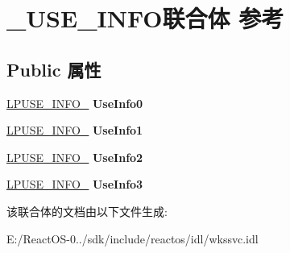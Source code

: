 \hypertarget{union___u_s_e___i_n_f_o}{}\section{\+\_\+\+U\+S\+E\+\_\+\+I\+N\+F\+O联合体 参考}
\label{union___u_s_e___i_n_f_o}
\subsection*{Public 属性}
\begin{DoxyCompactItemize}
\item 
\mbox{\label{union___u_s_e___i_n_f_o_a0598db1d840454bf62f693c88675dff3}} 
\hyperlink{struct___u_s_e___i_n_f_o__0}{L\+P\+U\+S\+E\+\_\+\+I\+N\+F\+O\+\_} {\bfseries Use\+Info0}
\item 
\mbox{\label{union___u_s_e___i_n_f_o_a307e20afe58c0661dd86d7f650014f1a}} 
\hyperlink{struct___u_s_e___i_n_f_o__1}{L\+P\+U\+S\+E\+\_\+\+I\+N\+F\+O\+\_} {\bfseries Use\+Info1}
\item 
\mbox{\label{union___u_s_e___i_n_f_o_af263e49ead9439a0b646451dc0ae0325}} 
\hyperlink{struct___u_s_e___i_n_f_o__2}{L\+P\+U\+S\+E\+\_\+\+I\+N\+F\+O\+\_} {\bfseries Use\+Info2}
\item 
\mbox{\label{union___u_s_e___i_n_f_o_a00dd1f97577aee1c6ffab93b831e34bf}} 
\hyperlink{struct___u_s_e___i_n_f_o__3}{L\+P\+U\+S\+E\+\_\+\+I\+N\+F\+O\+\_} {\bfseries Use\+Info3}
\end{DoxyCompactItemize}


该联合体的文档由以下文件生成\+:\begin{DoxyCompactItemize}
\item 
E\+:/\+React\+O\+S-\/0../sdk/include/reactos/idl/wkssvc.\+idl\end{DoxyCompactItemize}
